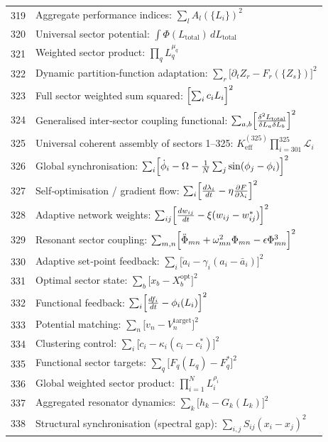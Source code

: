 \documentclass[12pt,a4paper]{article}
\begin{document}
\begin{longtable}{r l}
		319 & Aggregate performance indices: $\sum_l A_l(\{L_i\})^2$ \\
		320 & Universal sector potential: $\int\Phi(L_{\text{total}})\,dL_{\text{total}}$ \\
		321 & Weighted sector product: $\prod_q L_q^{\mu_q}$ \\
		322 & Dynamic partition‑function adaptation: $\sum_r\bigl[\partial_t Z_r - F_r(\{Z_s\})\bigr]^2$ \\
		323 & Full sector weighted sum squared: $\Bigl[\sum_i c_i L_i\Bigr]^2$ \\
		324 & Generalised inter‑sector coupling functional: $\sum_{a,b}\Bigl[\frac{\delta^2 L_{\text{total}}}{\delta L_a\delta L_b}\Bigr]^2$ \\
		325 & Universal coherent assembly of sectors 1–325: $K^{(325)}_{\mathrm{eff}}\prod_{i=301}^{325}\mathcal{L}_i$ \\
		326 & Global synchronisation: $\sum_i\Bigl[\dot\phi_i - \Omega - \frac1N\sum_j\sin(\phi_j-\phi_i)\Bigr]^2$ \\
		327 & Self‑optimisation / gradient flow: $\sum_i\Bigl[\frac{d\lambda_i}{dt} - \eta\frac{\partial F}{\partial\lambda_i}\Bigr]^2$ \\
		328 & Adaptive network weights: $\sum_{ij}\Bigl[\frac{dw_{ij}}{dt} - \xi(w_{ij}-w_{ij}^*)\Bigr]^2$ \\
		329 & Resonant sector coupling: $\sum_{m,n}\Bigl[\ddot\Phi_{mn} + \omega_{mn}^2\Phi_{mn} - \epsilon\Phi_{mn}^3\Bigr]^2$ \\
		330 & Adaptive set‑point feedback: $\sum_i\bigl[\dot a_i - \gamma_i(a_i - \bar a_i)\bigr]^2$ \\
		331 & Optimal sector state: $\sum_b\bigl[x_b - X_b^{\text{opt}}\bigr]^2$ \\
		332 & Functional feedback: $\sum_i\Bigl[\frac{df_i}{dt} - \phi_i(L_i)\Bigr]^2$ \\
		333 & Potential matching: $\sum_n\bigl[v_n - V_n^{\text{target}}\bigr]^2$ \\
		334 & Clustering control: $\sum_i\bigl[\dot c_i - \kappa_i(c_i - c_i^*)\bigr]^2$ \\
		335 & Functional sector targets: $\sum_q\bigl[F_q(L_q) - F_q^*\bigr]^2$ \\
		336 & Global weighted sector product: $\prod_{i=1}^N L_i^{\rho_i}$ \\
		337 & Aggregated resonator dynamics: $\sum_k\bigl[h_k - G_k(L_k)\bigr]^2$ \\
		338 & Structural synchronisation (spectral gap): $\sum_{i,j}S_{ij}(x_i - x_j)^2$ \\

\end{longtable}
\end{document}
